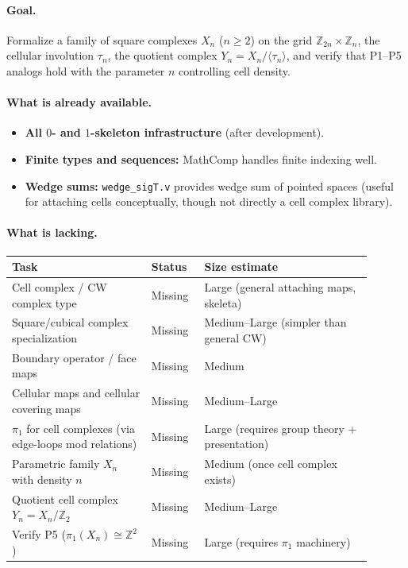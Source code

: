 \documentclass[11pt,a4paper]{article}
\theoremstyle{definition}
\theoremstyle{remark}
\begin{document}
\paragraph{Goal.}
Formalize a family of square complexes \(X_n\) (\(n\ge 2\)) on the grid \(\mathbb{Z}_{2n}\times\mathbb{Z}_n\), the cellular involution \(\tau_n\), the quotient complex \(Y_n=X_n/\langle\tau_n\rangle\), and verify that P1--P5 analogs hold with the parameter \(n\) controlling cell density.

\paragraph{What is already available.}
\begin{itemize}
  \item \textbf{All \(0\)- and \(1\)-skeleton infrastructure} (after development).
  \item \textbf{Finite types and sequences:} MathComp handles finite indexing well.
  \item \textbf{Wedge sums:} \texttt{wedge\_sigT.v} provides wedge sum of pointed spaces (useful for attaching cells conceptually, though not directly a cell complex library).
\end{itemize}

\paragraph{What is lacking.}
\begin{center}
\begin{tabular}{p{0.35\linewidth} p{0.13\linewidth} p{0.42\linewidth}}
\hline
\textbf{Task} & \textbf{Status} & \textbf{Size estimate}\\
\hline
Cell complex / CW complex type & Missing & Large (general attaching maps, skeleta)\\
Square/cubical complex specialization & Missing & Medium--Large (simpler than general CW)\\
Boundary operator / face maps & Missing & Medium\\
Cellular maps and cellular covering maps & Missing & Medium--Large\\
\(\pi_1\) for cell complexes (via edge-loops mod relations) & Missing & Large (requires group theory + presentation)\\
Parametric family \(X_n\) with density \(n\) & Missing & Medium (once cell complex exists)\\
Quotient cell complex \(Y_n=X_n/\mathbb{Z}_2\) & Missing & Medium--Large\\
Verify P5 (\(\pi_1(X_n)\cong\mathbb{Z}^2\)) & Missing & Large (requires \(\pi_1\) machinery)\\
\hline
\end{tabular}
\end{center}
\end{document}
